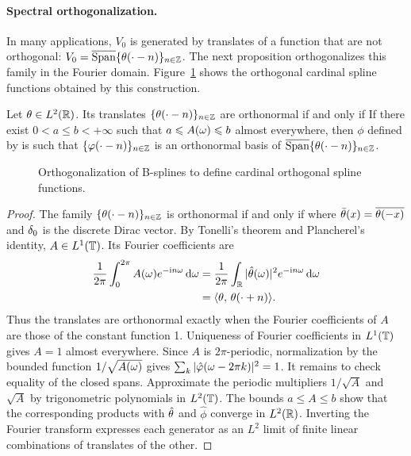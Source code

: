 \paragraph{Spectral orthogonalization.}

In many applications, $V_0$ is generated by translates of a function that are not orthogonal: $V_0=\overline{\operatorname{Span}}\{\theta(\cdot-n)\}_{n\in\mathbb{Z}}$. The next proposition orthogonalizes this family in the Fourier domain.
%
Figure~\ref{fig-spline-ortho} shows the orthogonal cardinal spline functions obtained by this construction.

\begin{prop}\label{prop-spectral-ortho}
	Let $\theta \in L^2(\mathbb{R})$. Its translates $\{\theta(\cdot-n)\}_{n \in \mathbb{Z}}$ are orthonormal if and only if
	If there exist $0 < a \leq b <+\infty$ such that $a \leqslant A(\omega) \leqslant b$ almost everywhere, then $\phi$ defined by
	is such that $\{\varphi(\cdot-n)\}_{n \in \mathbb{Z}}$ is an orthonormal basis of $\overline{\operatorname{Span}}\{\theta(\cdot-n)\}_{n\in\mathbb{Z}}$.
\end{prop}


\begin{figure}[tbp]
\centering
{}
\caption{Orthogonalization of B-splines to define cardinal orthogonal spline functions.}
\label{fig-spline-ortho}
\end{figure}

\begin{proof}
	The family $\{\theta(\cdot-n)\}_{n \in \mathbb{Z}}$ is orthonormal if and only if
	where $\bar{\theta}(x)=\overline{\theta(-x)}$ and $\delta_0$ is the discrete Dirac vector.
By Tonelli's theorem and Plancherel's identity, $A\in L^1(\mathbb{T})$. Its Fourier coefficients are
	\begin{align*}
		\frac{1}{2\pi}\int_0^{2\pi}A(\omega)e^{-\mathrm{i} n\omega}\,\mathrm{d}\omega
		&=\frac{1}{2\pi}\int_{\mathbb{R}} |\hat{\theta}(\omega)|^2e^{-\mathrm{i} n\omega}\,\mathrm{d}\omega\\
		&=\langle \theta,\,\theta(\cdot+n)\rangle.
	\end{align*}
	Thus the translates are orthonormal exactly when the Fourier coefficients of $A$ are those of the constant function 1. Uniqueness of Fourier coefficients in $L^1(\mathbb{T})$ gives $A=1$ almost everywhere.
	Since $A$ is $2\pi$-periodic, normalization by the bounded function $1/\sqrt{A(\omega)}$ gives $\sum_{k} |\hat {\varphi}(\omega-2\pi k)|^2 = 1$. It remains to check equality of the closed spans. Approximate the periodic multipliers $1/\sqrt A$ and $\sqrt A$ by trigonometric polynomials in $L^2(\mathbb{T})$. The bounds $a\leq A\leq b$ show that the corresponding products with $\hat{\theta}$ and $\hat\phi$ converge in $L^2(\mathbb{R})$. Inverting the Fourier transform expresses each generator as an $L^2$ limit of finite linear combinations of translates of the other.
\end{proof}

